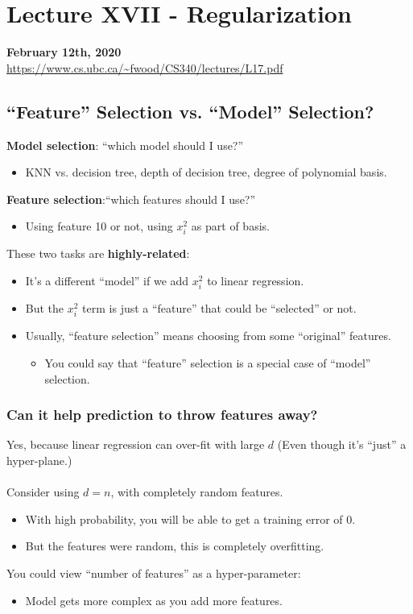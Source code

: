 \documentclass{article}
\def\blu#1{{\color{blu}#1}}
\def\gre#1{{\color{gre}#1}}
\def\red#1{{\color{red}#1}}
\begin{document}
\section*{Lecture XVII - Regularization}
\textbf{February 12th, 2020} \\
\url{https://www.cs.ubc.ca/~fwood/CS340/lectures/L17.pdf}

\subsection*{“Feature” Selection vs. “Model” Selection?}
\blu{\textbf{Model selection}}: “which model should I use?”
\begin{itemize}
	\item KNN vs. decision tree, depth of decision tree, \gre{degree of polynomial basis}. 
\end{itemize}
\blu{\textbf{Feature selection}}:“which features should I use?”
\begin{itemize}
	\item Using feature 10 or not, \gre{using $ x_i^2 $ as part of basis}.
\end{itemize}
These two tasks are \gre{\textbf{highly-related}}:
\begin{itemize}
	\item It’s a different “model” if we add $ x_i^2 $ to linear regression.
	\item But the $ x_i^2 $ term is just a “feature” that could be “selected” or not.
	\item Usually, “feature selection” means choosing from some “original” features. 
	\begin{itemize}
		\item You could say that “feature” selection is a special case of “model” selection.
	\end{itemize}
\end{itemize}

\subsubsection*{Can it help prediction to throw features away?}
Yes, because \red{linear regression can over-fit} with large $ d $ (Even though it’s “just” a hyper-plane.) \\ \\
Consider using $ d = n $, with completely random features. 
\begin{itemize}
	\item With high probability, you will be able to \red{get a training error of 0}. 
	\item But the features were random, this is \red{completely overfitting}.
\end{itemize}
You could view \gre{“number of features” as a hyper-parameter}:
\begin{itemize}
	\item Model gets more complex as you add more features.
\end{itemize}
\end{document}
